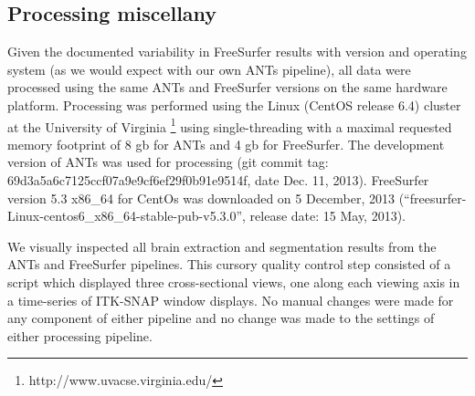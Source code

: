 \subsection{Processing miscellany}

Given the documented variability in FreeSurfer results with version and
operating system \cite{gronenschild2012} (as we would expect with our own ANTs pipeline),
all data were processed using the same ANTs and FreeSurfer versions on the same 
hardware platform.  Processing was performed using the Linux (CentOS release 6.4) 
cluster at the University 
of Virginia%
\footnote{
http://www.uvacse.virginia.edu/
}
using single-threading with a maximal requested memory footprint of 8 gb for ANTs 
and 4 gb for FreeSurfer.  The development version of ANTs was used for processing 
(git commit tag: 69d3a5a6c7125ccf07a9e9cf6ef29f0b91e9514f, date Dec. 11, 2013).  
FreeSurfer version 5.3 x86\_64 for CentOs was downloaded 
on 5 December, 2013 (``freesurfer-Linux-centos6\_x86\_64-stable-pub-v5.3.0'', release
date: 15 May, 2013). 

We visually inspected all brain extraction and segmentation results from the ANTs and FreeSurfer pipelines. This cursory quality control step consisted of a script which displayed three cross-sectional views, one along each viewing axis in a time-series of ITK-SNAP window displays. No manual changes were made for any component of either pipeline and no change was made to the settings of either processing pipeline.

